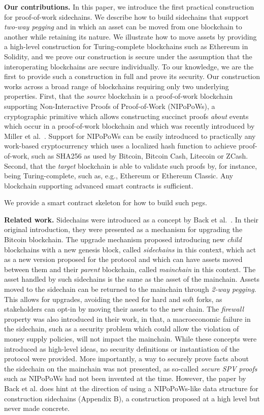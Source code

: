 \noindent\textbf{Our contributions. } In this paper, we introduce the first
practical construction for proof-of-work sidechains. We describe how to build
sidechains that support \emph{two-way pegging} and in which an asset can be
moved from one blockchain to another while retaining its nature. We illustrate
how to move assets by providing a high-level construction for Turing-complete
blockchains such as Ethereum in Solidity, and we prove our construction is
secure under the assumption that the interoperating blockchains are secure
individually. To our knowledge, we are the first to provide such a construction
in full and prove its security. Our construction works across a broad range of
blockchains requiring only two underlying properties. First, that the
\emph{source} blockchain is a proof-of-work blockchain supporting
Non-Interactive Proofs of Proof-of-Work (NIPoPoWs), a cryptographic primitive
which allows constructing succinct proofs \emph{about} events which occur in a
proof-of-work blockchain and which was recently introduced by Miller et
al.~\cite{nipopows}. Support for NIPoPoWs can be easily introduced to practically
any work-based cryptocurrency which uses a localized hash function to achieve
proof-of-work, such as SHA256 as used by Bitcoin, Bitcoin Cash, Litecoin or
ZCash. Second, that the \emph{target} blockchain is able to validate such proofs
by, for instance, being Turing-complete, such as, e.g., Ethereum or Ethereum
Classic. Any blockchain supporting advanced smart contracts is sufficient.

We provide a smart contract skeleton for how to build such pegs.

\noindent\textbf{Related work. }
Sidechains were introduced as a concept by Back et al.~\cite{sidechains}. In
their original introduction, they were presented as a mechanism for upgrading
the Bitcoin blockchain. The upgrade mechanism proposed introducing new
\emph{child} blockchains with a new genesis block, called
\emph{sidechains} in this context, which act as a new version proposed for the
protocol and which can have assets moved between them and their \emph{parent}
blockchain, called \emph{mainchain} in this context. The asset handled by such
sidechains is the same as the asset of the mainchain. Assets moved to the
sidechain can be returned to the mainchain through \emph{2-way pegging}. This
allows for upgrades, avoiding the need for hard and soft forks, as stakeholders
can opt-in by moving their assets to the new chain. The \emph{firewall}
property was also introduced in their work, in that, a macroeconomic failure in
the sidechain, such as a security problem which could allow the violation of
money supply policies, will not impact the mainchain. While these concepts were
introduced as high-level ideas, no security definitions or instantiation of the
protocol were provided. More importantly, a way to securely prove facts about
the sidechain on the mainchain was not presented, as so-called \emph{secure SPV
proofs} such as NIPoPoWs had not been invented at the time. However, the paper
by Back et al. does hint at the direction of using a NIPoPoWs-like data
structure for construction sidechains (Appendix B), a construction proposed at a
high level but never made concrete.

